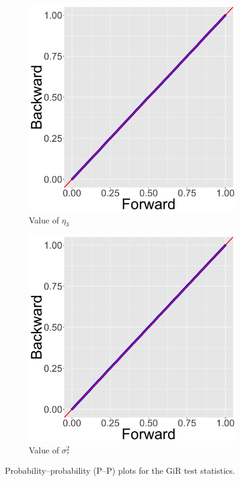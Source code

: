 \documentclass[ba]{imsart}
\numberwithin{equation}{section}
\theoremstyle{plain}
\begin{document}
\begin{figure}[!t]
\begin{subfigure}[b]{0.2425\textwidth}
		\end{subfigure}   	   		   	   	
		\begin{subfigure}[b]{0.2425\textwidth}
			\caption{Value of $\eta_3$}
			\includegraphics[width=\textwidth]{img/plot11.png}	
		\end{subfigure}   	   		   	   	  		   	   	 	
		\begin{subfigure}[b]{0.2425\textwidth}
			\caption{Value of $\sigma^2_\tau$}
			\includegraphics[width=\textwidth]{img/plot12.png}	
		\end{subfigure}   	   		   	   	   	   		   	   	   		   	   	
		\caption{Probability--probability (P--P) plots for the GiR test statistics.}
		\label{figure:GiRplot}
	\end{figure}   
\end{document}

